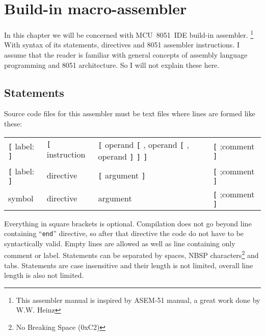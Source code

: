 \documentclass[a4paper,twoside,12pt]{book}
\newcommand{\mysmallfont}{\fontsize{8pt}{10pt} \selectfont{}}
\begin{document}
\chapter{Build-in macro-assembler}
	In this chapter we will be concerned with MCU~8051~IDE build-in assembler. \footnote{This assembler manual is inspired by ASEM-51 manual, a great work done by W.W. Heinz} With syntax of its statements, directives and 8051 assembler instructions. I assume that the reader is familiar with general concepts of assembly language programming and 8051 architecture. So I will not explain these here.

	\section{Statements}
		Source code files for this assembler must be text files where lines are formed like these:\\\bigskip
		{
			\mysmallfont{}
			\texttt{}
			\begin{tabular}[h!]{llll}
				\verb'[' { \color{highlight_label} label: } \verb']' &
				\verb'[' { \color{highlight_instruction} instruction } &
				\verb'[' { \color{highlight_symbol} operand } \verb'[' , { \color{highlight_symbol} operand } \verb'[' , { \color{highlight_symbol} operand } \verb']' \verb']' \verb']' &
				\verb'[' { \color{highlight_comment} ;comment } \verb']' \\

				\verb'[' { \color{highlight_label} label: } \verb']' &
				{ \color{highlight_directive} directive } &
				\verb'[' { \color{highlight_symbol} argument } \verb']' &
				\verb'[' { \color{highlight_comment} ;comment } \verb']' \\

				{ \color{highlight_constant} symbol } &
				{ \color{highlight_directive} directive } &
				{ \color{highlight_symbol} argument } &
				\verb'[' { \color{highlight_comment} ;comment } \verb']' \\
			\end{tabular}
		}
		\bigskip

		Everything in square brackets is optional. Compilation does not go beyond line containing ``\texttt{end}'' directive, so after that directive the code do not have to be syntactically valid. Empty lines are allowed as well as line containing only comment or label. Statements can be separated by spaces, NBSP characters\footnote{No Breaking Space (0xC2)} and tabs. Statements are case insensitive and their length is not limited, overall line length is also not limited.
\end{document}
